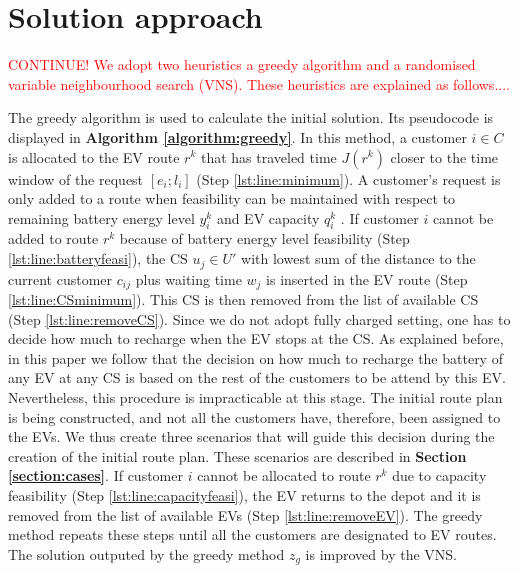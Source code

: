\documentclass[11pt]{article}
\begin{document}
\section{Solution approach}
\label{section:approach}
\textcolor{red}{CONTINUE! We adopt two heuristics a greedy algorithm and a randomised variable neighbourhood search (VNS). These heuristics are explained as follows....}

The greedy algorithm is used to calculate the initial solution. Its pseudocode is displayed in \textbf{Algorithm \ref{algorithm:greedy}}. In this method, a customer $i \in C$ is allocated to the EV route $r^k$ that has traveled time $J(r^k)$ closer to the time window of the request $[e_i;l_i]$ (Step \ref{lst:line:minimum}). A customer's request is only added to a route when feasibility can be maintained with respect to remaining battery energy level $y^k_i$ and EV capacity $q^k_i$ . If customer $i$ cannot be added to route $r^k$ because of battery energy level feasibility (Step \ref{lst:line:batteryfeasi}), the CS $u_j \in U'$ with lowest sum of the distance to the current customer $c_{ij}$ plus waiting time $w_j$ is inserted in the EV route (Step \ref{lst:line:CSminimum}). This CS is then removed from the list of available CS (Step \ref{lst:line:removeCS}). Since we do not adopt fully charged setting, one has to decide how much to recharge when the EV stops at the CS. As explained before, in this paper we follow that the decision on how much to recharge the battery of any EV at any CS is based on the rest of the customers to be attend by this EV. Nevertheless, this procedure is impracticable at this stage. The initial route plan is being constructed, and not all the customers have, therefore, been assigned to the EVs. We thus create three scenarios that will guide this decision during the creation of the initial route plan. These scenarios are described in \textbf{Section \ref{section:cases}}. If customer $i$ cannot be allocated to route $r^k$ due to capacity feasibility (Step \ref{lst:line:capacityfeasi}), the EV returns to the depot and it is removed from the list of available EVs (Step \ref{lst:line:removeEV}). The greedy method repeats these steps until all the customers are designated to EV routes. The solution outputed by the greedy method $z_g$ is improved by the VNS. 
\end{document}
